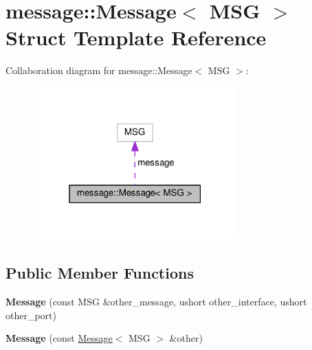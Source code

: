 \hypertarget{structmessage_1_1Message}{}\section{message\+:\+:Message$<$ M\+SG $>$ Struct Template Reference}
\label{structmessage_1_1Message}


Collaboration diagram for message\+:\+:Message$<$ M\+SG $>$\+:\nopagebreak
\begin{figure}[H]
\begin{center}
\leavevmode
\includegraphics[width=223pt]{structmessage_1_1Message__coll__graph}
\end{center}
\end{figure}
\subsection*{Public Member Functions}
\begin{DoxyCompactItemize}
\item 
{\bfseries Message} (const M\+SG \&other\+\_\+message, ushort other\+\_\+interface, ushort other\+\_\+port)\hypertarget{structmessage_1_1Message_ae95c09e37177e9cef665c164876b94cd}{}\label{structmessage_1_1Message_ae95c09e37177e9cef665c164876b94cd}

\item 
{\bfseries Message} (const \hyperlink{structmessage_1_1Message}{Message}$<$ M\+SG $>$ \&other)\hypertarget{structmessage_1_1Message_a3d3bd5f3aaa91f1e27e8831634c7f730}{}\label{structmessage_1_1Message_a3d3bd5f3aaa91f1e27e8831634c7f730}

\end{DoxyCompactItemize}
